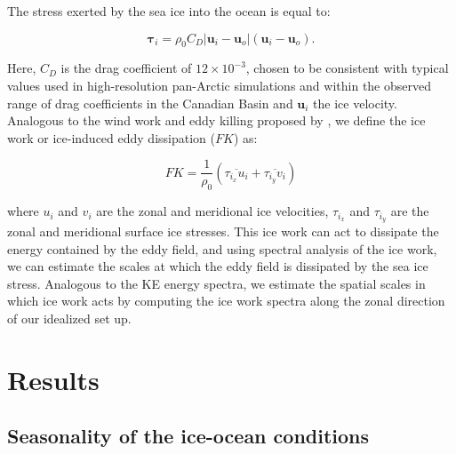 \documentclass[draft]{agujournal2019}
\begin{document}
The stress exerted by the sea ice into the ocean is equal to: 
\begin{linenomath*}
\begin{equation}
  \boldsymbol{\tau}_i = \rho_0 C_D | \mathbf{u}_i - \mathbf{u}_o | \left(\mathbf{u}_i - \mathbf{u}_o\right).
  \label{eq:eq17}
\end{equation}
\end{linenomath*}
Here, $C_D$ is the drag coefficient of $12\times10^{-3}$, chosen to be consistent with typical values used in high-resolution pan-Arctic simulations and within the observed range of drag coefficients in the Canadian Basin \citep{Cole_drag_2017, Dupont_creg_2015} and $\mathbf{u}_i$ the ice velocity. 
Analogous to the wind work and eddy killing proposed by \citet{Renault_coupling_2016}, we define the ice work or ice-induced eddy dissipation ($FK$) as:
\begin{linenomath*}
\begin{equation}
  FK = \frac{1}{\rho_0} \left( \overline{\tau_{i_x} u_i} + \overline{\tau_{i_y} v_i} \right)
  \label{eq:eq18}
\end{equation}
\end{linenomath*}
where $u_i$ and $v_i$ are the zonal and meridional ice velocities, $\tau_{i_x}$ and $\tau_{i_y}$ are the zonal and meridional surface ice stresses. This ice work can act to dissipate the energy contained by the eddy field, and using spectral analysis of the ice work, we can estimate the scales at which the eddy field is dissipated by the sea ice stress. Analogous to the KE energy spectra, we estimate the spatial scales in which ice work acts by computing the ice work spectra along the zonal direction of our idealized set up.

\section{Results}
\label{results}

\subsection{Seasonality of the ice-ocean conditions}
\label{sec3.1}
\end{document}

